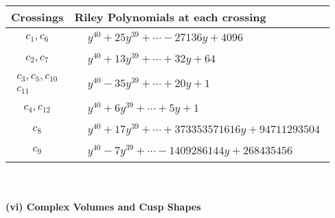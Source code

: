 \documentclass[1p]{elsarticle_modified}
\theoremstyle{definition}
\begin{document}
\begin{tabular}{m{50pt}|m{274pt}}
Crossings & \hspace{64pt}Riley Polynomials at each crossing \\
\hline $$\begin{aligned}c_{1},c_{6}\end{aligned}$$&$\begin{aligned}
&y^{40}+25 y^{39}+\cdots-27136 y+4096
\end{aligned}$\\
\hline $$\begin{aligned}c_{2},c_{7}\end{aligned}$$&$\begin{aligned}
&y^{40}+13 y^{39}+\cdots+32 y+64
\end{aligned}$\\
\hline $$\begin{aligned}c_{3},c_{5},c_{10}\\c_{11}\end{aligned}$$&$\begin{aligned}
&y^{40}-35 y^{39}+\cdots+20 y+1
\end{aligned}$\\
\hline $$\begin{aligned}c_{4},c_{12}\end{aligned}$$&$\begin{aligned}
&y^{40}+6 y^{39}+\cdots+5 y+1
\end{aligned}$\\
\hline $$\begin{aligned}c_{8}\end{aligned}$$&$\begin{aligned}
&y^{40}+17 y^{39}+\cdots+373353571616 y+94711293504
\end{aligned}$\\
\hline $$\begin{aligned}c_{9}\end{aligned}$$&$\begin{aligned}
&y^{40}-7 y^{39}+\cdots-1409286144 y+268435456
\end{aligned}$\\
\hline
\end{tabular}\\~\\
\newpage\flushleft \textbf{(vi) Complex Volumes and Cusp Shapes}
\end{document}
